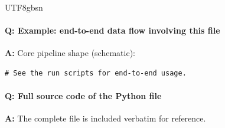 \documentclass[11pt]{article}
\begin{document}
\begin{CJK*}{UTF8}{gbsn}
\vspace{1mm}


\paragraph{Q: Example: end-to-end data flow involving this file}
\textbf{A:} Core pipeline shape (schematic):

\begin{Verbatim}[fontsize=\small]
# See the run scripts for end-to-end usage.
\end{Verbatim}

\paragraph{Q: Full source code of the Python file}
\textbf{A:} The complete file is included verbatim for reference.


\end{CJK*}
\end{document}
